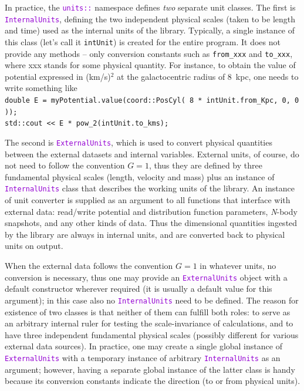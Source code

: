 \documentclass[12pt]{article}
\newcommand{\Nbody}{\textsl{N}-body\xspace}
\newcommand{\ttt}[1]{\textcolor{darkviolet}{\texttt{#1}}}
\begin{document}
In practice, the \ttt{units::} namespace defines \textit{two} separate unit classes. The first is \ttt{InternalUnits}, defining the two independent physical scales (taken to be length and time) used as the internal units of the library. Typically, a single instance of this class (let's call it \texttt{intUnit}) is created for the entire program. It does not provide any methods -- only conversion constants such as \texttt{from_xxx} and \texttt{to_xxx}, where xxx stands for some physical quantity. For instance, to obtain the value of potential expressed in (km/s)${}^2$ at the galactocentric radius of 8~kpc, one needs to write something like \\
\texttt{double E = myPotential.value(coord::PosCyl( 8 * intUnit.from_Kpc, 0, 0 ));}\\
\texttt{std::cout << E * pow_2(intUnit.to_kms);}

The second is \ttt{ExternalUnits}, which is used to convert physical quantities between the external datasets and internal variables. External units, of course, do not need to follow the convention $G=1$, thus they are defined by three fundamental physical scales (length, velocity and mass) plus an instance of \ttt{InternalUnits} class that describes the working units of the library. An instance of unit converter is supplied as an argument to all functions that interface with external data: read/write potential and distribution function parameters, \Nbody snapshots, and any other kinds of data. Thus the dimensional quantities ingested by the library are always in internal units, and are converted back to physical units on output.

When the external data follows the convention $G=1$ in whatever units, no conversion is necessary, thus one may provide an \ttt{ExternalUnits} object with a default constructor wherever required (it is usually a default value for this argument); in this case also no \ttt{InternalUnits} need to be defined. The reason for existence of two classes is that neither of them can fulfill both roles: to serve as an arbitrary internal ruler for testing the scale-invariance of calculations, and to have three independent fundamental physical scales (possibly different for various external data sources). In practice, one may create a single global instance of \ttt{ExternalUnits} with a temporary instance of arbitrary \ttt{InternalUnits} as an argument; however, having a separate global instance of the latter class is handy because its conversion constants indicate the direction (to or from physical units).
\end{document}
